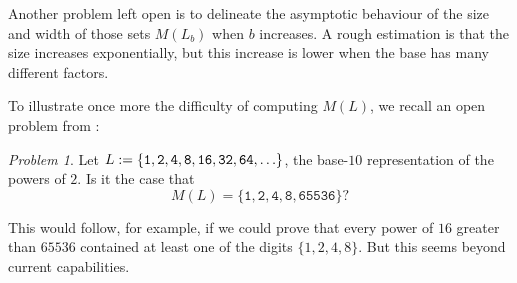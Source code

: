 \documentclass[12pt]{article}
\theoremstyle{plain}
\theoremstyle{definition}
\theoremstyle{remark}
\newtheorem{problem}[theorem]{Problem}
\newcommand{\0}{\mathtt{0}}
\newcommand{\1}{\mathtt{1}}
\newcommand{\2}{\mathtt{2}}
\newcommand{\3}{\mathtt{3}}
\newcommand{\4}{\mathtt{4}}
\newcommand{\5}{\mathtt{5}}
\newcommand{\6}{\mathtt{6}}
\newcommand{\7}{\mathtt{7}}
\newcommand{\8}{\mathtt{8}}
\newcommand{\9}{\mathtt{9}}
\begin{document}
Another problem left open is to delineate the asymptotic behaviour of the size and width of those sets $M(L_b)$ when $b$ increases.
A rough estimation is that the size increases exponentially, but this increase is lower when the base has many different factors.

To illustrate once more the difficulty of computing $M(L)$, we recall
an open problem from \cite{Sh00}:

\begin{problem} 
Let $L := \lbrace {\tt 1, 2, 4, 8, 16, 32, 64, } \ldots \rbrace$, the
base-$10$ representation of the powers of $2$.  
Is it the case that
$$ M(L) = \lbrace \1, \2, \4, \8, \6\5\5\3\6 \rbrace ? $$
\end{problem}

This would follow, for example, if we could prove that every power
of $16$ greater than $65536$ contained at least one of the digits
$\lbrace 1,2,4, 8 \rbrace$.  But this seems beyond current capabilities.
\end{document}
